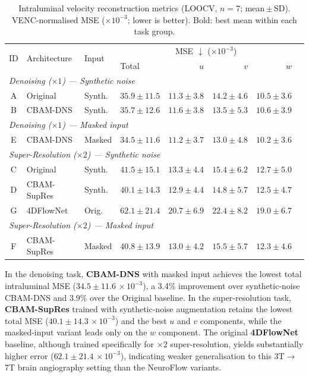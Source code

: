 \documentclass[11pt]{article}
\begin{document}
\begin{table}[!htbp]
  \centering
  \caption{Intraluminal velocity reconstruction metrics (LOOCV, $n=7$; mean\,$\pm$\,SD).
  VENC-normalised MSE ($\times 10^{-3}$; lower is better). Bold: best mean within each
  task group.}
  \label{tab:velocity}
  \setlength{\tabcolsep}{4pt}
  \small
  \begin{tabular}{clll rrrr}
    \toprule
    \multirow{2}{*}{ID} & \multirow{2}{*}{Architecture} & \multirow{2}{*}{Input} &
      \multicolumn{4}{c}{MSE $\downarrow$ ($\times 10^{-3}$)} \\
    \cmidrule(lr){4-7}
    & & & Total & $u$ & $v$ & $w$ \\
    \midrule
    \multicolumn{7}{l}{\textit{Denoising ($\times 1$) --- Synthetic noise}} \\
    \midrule
    A & Original  & Synth. & $35.9 \pm 11.5$ & $11.3 \pm 3.8$ & $14.2 \pm 4.6$ & $10.5 \pm 3.6$ \\
    B & CBAM-DNS  & Synth. & $35.7 \pm 12.6$ & $11.6 \pm 3.8$ & $13.5 \pm 5.3$ & $10.6 \pm 3.9$ \\
    \multicolumn{7}{l}{\textit{Denoising ($\times 1$) --- Masked input}} \\
    \midrule
    E & CBAM-DNS  & Masked & $\mathbf{34.5 \pm 11.6}$ & $\mathbf{11.2 \pm 3.7}$ & $\mathbf{13.0 \pm 4.8}$ & $\mathbf{10.2 \pm 3.6}$ \\
    \midrule
    \multicolumn{7}{l}{\textit{Super-Resolution ($\times 2$) --- Synthetic noise}} \\
    \midrule
    C & Original    & Synth. & $41.5 \pm 15.1$ & $13.3 \pm 4.4$ & $15.4 \pm 6.2$ & $12.7 \pm 5.0$ \\
    D & CBAM-SupRes & Synth. & $\mathbf{40.1 \pm 14.3}$ & $\mathbf{12.9 \pm 4.4}$ & $\mathbf{14.8 \pm 5.7}$ & $12.5 \pm 4.7$ \\
    G & 4DFlowNet   & Orig.  & $62.1 \pm 21.4$ & $20.7 \pm 6.9$ & $22.4 \pm 8.2$ & $19.0 \pm 6.7$ \\
    \multicolumn{7}{l}{\textit{Super-Resolution ($\times 2$) --- Masked input}} \\
    \midrule
    F & CBAM-SupRes & Masked & $40.8 \pm 13.9$ & $13.0 \pm 4.2$ & $15.5 \pm 5.7$ & $\mathbf{12.3 \pm 4.6}$ \\
    \bottomrule
  \end{tabular}
\end{table}

In the denoising task, \textbf{CBAM-DNS} with masked input achieves the lowest total
intraluminal MSE ($34.5 \pm 11.6\,{\times}10^{-3}$), a 3.4\% improvement over synthetic-noise
CBAM-DNS and 3.9\% over the Original baseline. In the super-resolution task,
\textbf{CBAM-SupRes} trained with synthetic-noise augmentation retains the lowest total MSE
($40.1 \pm 14.3\,{\times}10^{-3}$) and the best $u$ and $v$ components, while the masked-input
variant leads only on the $w$ component. The original \textbf{4DFlowNet} baseline, although
trained specifically for $\times 2$ super-resolution, yields substantially higher error
($62.1 \pm 21.4\,{\times}10^{-3}$), indicating weaker generalisation to this 3T$\rightarrow$7T
brain angiography setting than the NeuroFlow variants.
\end{document}
